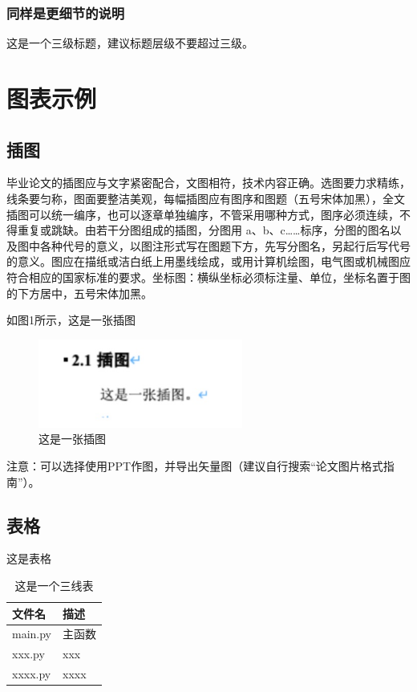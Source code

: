\documentclass[12pt,a4paper]{ctexart}
\begin{document}
\subsubsection{同样是更细节的说明}
这是一个三级标题，建议标题层级不要超过三级。

\newpage
\section{图表示例}
\subsection{插图}
毕业论文的插图应与文字紧密配合，文图相符，技术内容正确。选图要力求精练，线条要匀称，图面要整洁美观，每幅插图应有图序和图题（五号宋体加黑），全文插图可以统一编序，也可以逐章单独编序，不管采用哪种方式，图序必须连续，不得重复或跳缺。由若干分图组成的插图，分图用 a、b、c……标序，分图的图名以及图中各种代号的意义，以图注形式写在图题下方，先写分图名，另起行后写代号的意义。图应在描纸或洁白纸上用墨线绘成，或用计算机绘图，电气图或机械图应符合相应的国家标准的要求。坐标图：横纵坐标必须标注量、单位，坐标名置于图的下方居中，五号宋体加黑。

如图1所示，这是一张插图
\begin{figure}[h]
\centering
\includegraphics[width=0.6\textwidth]{1.png}
\caption{这是一张插图}
\label{fig:example}
\end{figure}

注意：可以选择使用PPT作图，并导出矢量图（建议自行搜索“论文图片格式指南”）。

\subsection{表格}
这是表格
\begin{table}[h]
    \centering
    \caption{这是一个三线表}
    \begin{tabular}{ll}
        \toprule
        文件名 & 描述 \\
        \midrule
        main.py & 主函数 \\
        xxx.py & xxx \\
        xxxx.py & xxxx \\
        \bottomrule
    \end{tabular}
\end{table}
\end{document}
